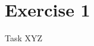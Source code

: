 
\section{Exercise 1}

\setcounter{exercise}{1}

\begin{frame}[allowframebreaks]{Task \thesection}{XYZ}
  \begin{requirementsnoinc}
    
  \end{requirementsnoinc}
  \begin{exercisenoinc}
    
  \end{exercisenoinc}
  \begin{solutionnoinc}
  \end{solutionnoinc}
\end{frame}
